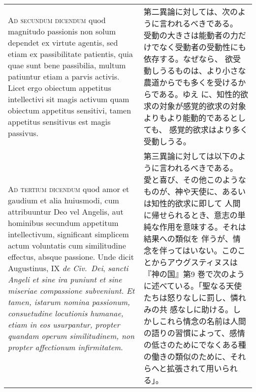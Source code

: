 \documentclass[10pt]{jsarticle} %
\begin{document}
\begin{longtable}{p{21em}p{21em}}
\\



{\scshape Ad secundum dicendum} quod magnitudo passionis non solum dependet ex
virtute agentis, sed etiam ex passibilitate patientis, quia quae sunt
bene passibilia, multum patiuntur etiam a parvis activis. Licet ergo
obiectum appetitus intellectivi sit magis activum quam obiectum
appetitus sensitivi, tamen appetitus sensitivus est magis passivus.

&

第二異論に対しては、次のように言われるべきである。
受動の大きさは能動者の力だけでなく受動者の受動性にも依存する。なぜなら、
 欲受動しうるものは、より小さな農道からでも多くを受けるからである。ゆえ
 に、知性的欲求の対象が感覚的欲求の対象よりもより能動的であるとしても、
 感覚的欲求はより多く受動しうる。

\\



{\scshape Ad tertium dicendum} quod amor et gaudium et alia huiusmodi, cum
attribuuntur Deo vel Angelis, aut hominibus secundum appetitum
intellectivum, significant simplicem actum voluntatis cum similitudine
effectus, absque passione. Unde dicit Augustinus, IX {\itshape de Civ.~Dei}, {\itshape sancti
Angeli et sine ira puniunt et sine miseriae compassione subveniunt. Et
tamen, istarum nomina passionum, consuetudine locutionis humanae, etiam
in eos usurpantur, propter quandam operum similitudinem, non propter
affectionum infirmitatem}.

&


第三異論に対しては以下のように言われるべきである。
愛と喜び、その他このようなものが、神や天使に、あるいは知性的欲求に即して
 人間に帰せられるとき、意志の単純な作用を意味する。それは結果への類似を
 伴うが、情念を伴ってはいない。このことからアウグスティヌスは『神の国』第9
 巻で次のように述べている。「聖なる天使たちは怒りなしに罰し、憐れみの共
 感なしに助ける。しかしこれら情念の名前は人間の語りの習慣によって、感情の低さのためにでなくある種
 の働きの類似のために、それらへと拡張されて用いられる」。


\end{longtable}
\end{document}
